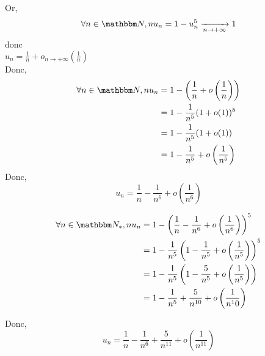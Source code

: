 Or, \[
	\forall n \in \N, nu_n = 1 - u_n^5 \tendsto{n \to +\infty} 1
\] donc \\

$u_n = \frac{1}{n} + o_{n\to +\infty}\left(\frac{1}{n}\right)$\\
Donc, 
\begin{align*}
	\forall n \in \N, nu_n &= 1 - \left( \frac{1}{n} + o\left( \frac{1}{n} \right)  \right)  \\
	&= 1 - \frac{1}{n^5}(1+o(1))^5 \\
	&= 1 - \frac{1}{n^5}(1 + o(1)) \\
	&= 1 - \frac{1}{n^5}+ o\left( \frac{1}{n^5} \right) \\
\end{align*}
Donc, \[
u_n = \frac{1}{n} - \frac{1}{n^6} + o\left( \frac{1}{n^6} \right) 
\] 

\begin{align*}
	\forall n \in \N_*, nu_n &= 1 - \left( \frac{1}{n} - \frac{1}{n^6} + o\left( \frac{1}{n^6} \right)  \right) ^5 \\
	&= 1 - \frac{1}{n^5}\left( 1 - \frac{1}{n^5} + o\left( \frac{1}{n^5} \right) \right) ^5 \\
	&= 1 - \frac{1}{n^5}\left( 1 - \frac{5}{n^5}+o\left( \frac{1}{n^5} \right)  \right)  \\
	&= 1 - \frac{1}{n^5} + \frac{5}{n^{10}} + o\left( \frac{1}{n^10} \right)  \\
\end{align*}

Donc, \[
	u_n = \frac{1}{n} - \frac{1}{n^6} + \frac{5}{n^{11}} + o\left( \frac{1}{n^{11}} \right) 
\] 
